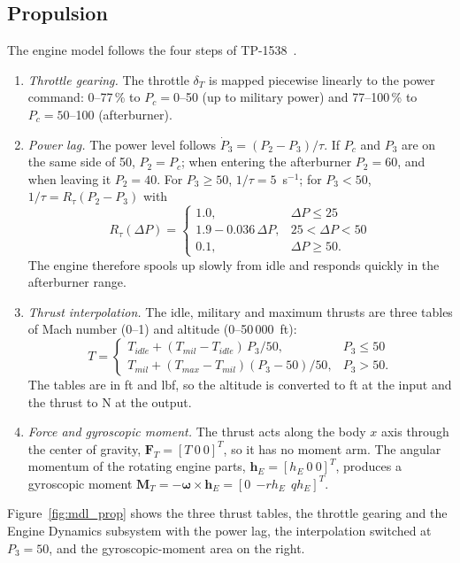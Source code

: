 \documentclass[conf]{new-aiaa}
\begin{document}
\subsection{Propulsion}
The engine model follows the four steps of TP-1538~\cite{tp1538}.
\begin{enumerate}
\item \emph{Throttle gearing.} The throttle $\delta_T$ is mapped piecewise linearly to the power command: 0--77\,\% to $P_c=0$--50 (up to military power) and 77--100\,\% to $P_c=50$--100 (afterburner).
\item \emph{Power lag.} The power level follows $\dot P_3=(P_2-P_3)/\tau$. If $P_c$ and $P_3$ are on the same side of 50, $P_2=P_c$; when entering the afterburner $P_2=60$, and when leaving it $P_2=40$. For $P_3\ge50$, $1/\tau=5$~s$^{-1}$; for $P_3<50$, $1/\tau=R_\tau(P_2-P_3)$ with
\begin{equation}
R_\tau(\Delta P)=\begin{cases}1.0, & \Delta P\le25\\ 1.9-0.036\,\Delta P, & 25<\Delta P<50\\ 0.1, & \Delta P\ge50.\end{cases}
\end{equation}
The engine therefore spools up slowly from idle and responds quickly in the afterburner range.
\item \emph{Thrust interpolation.} The idle, military and maximum thrusts are three tables of Mach number (0--1) and altitude (0--50\,000~ft):
\begin{equation}
T=\begin{cases}T_{idle}+(T_{mil}-T_{idle})\,P_3/50, & P_3\le50\\ T_{mil}+(T_{max}-T_{mil})(P_3-50)/50, & P_3>50.\end{cases}
\end{equation}
The tables are in ft and lbf, so the altitude is converted to ft at the input and the thrust to N at the output.
\item \emph{Force and gyroscopic moment.} The thrust acts along the body $x$ axis through the center of gravity, $\mathbf F_T=[T\ 0\ 0]^T$, so it has no moment arm. The angular momentum of the rotating engine parts, $\mathbf h_E=[h_E\ 0\ 0]^T$, produces a gyroscopic moment $\mathbf M_T=-\boldsymbol\omega\times\mathbf h_E=[0\ \ {-r}h_E\ \ qh_E]^T$.
\end{enumerate}
Figure~\ref{fig:mdl_prop} shows the three thrust tables, the throttle gearing and the Engine Dynamics subsystem with the power lag, the interpolation switched at $P_3=50$, and the gyroscopic-moment area on the right.
\end{document}
